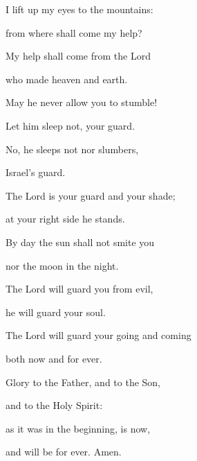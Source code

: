 \noindent I lift up my eyes to the mountains:~\GreStar{}~\nopagebreak

from where shall come my help?

\noindent My help shall come from the Lord~\GreStar{}~\nopagebreak

who made heaven and earth.

\noindent May he never allow you to stumble!~\GreStar{}~\nopagebreak

Let him sleep not, your guard.

\noindent No, he sleeps not nor slumbers,~\GreStar{}~\nopagebreak

Israel’s guard.

\noindent The Lord is your guard and your shade;~\GreStar{}~\nopagebreak

at your right side he stands.

\noindent By day the sun shall not smite you~\GreStar{}~\nopagebreak

nor the moon in the night.

\noindent The Lord will guard you from evil,~\GreStar{}~\nopagebreak

he will guard your soul.

\noindent The Lord will guard your going and coming~\GreStar{}~\nopagebreak

both now and for ever.

\noindent Glory to the Father, and to the Son,~\GreStar{}~\nopagebreak

and to the Holy Spirit:

\noindent as it was in the beginning, is now,~\GreStar{}~\nopagebreak

and will be for ever. Amen.

